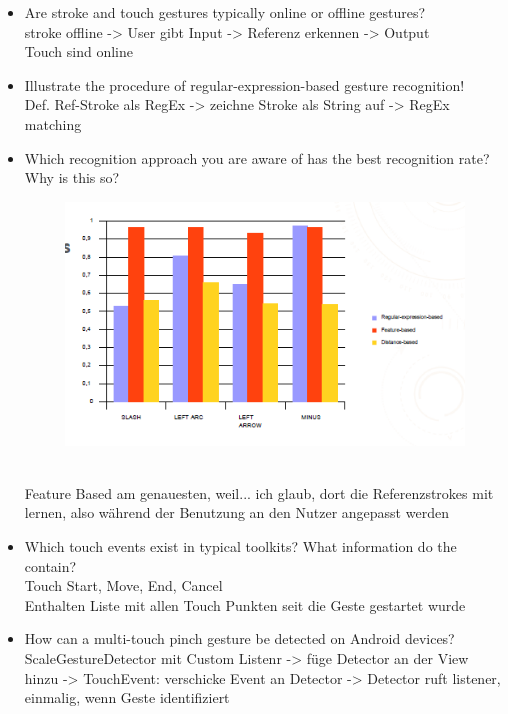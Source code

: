 \begin{itemize}
	\item Are stroke and touch gestures typically online or offline gestures?\\
	stroke offline -> User gibt Input -> Referenz erkennen -> Output\\
	Touch sind online
	
	\item Illustrate the procedure of regular-expression-based gesture recognition!\\
	Def. Ref-Stroke als RegEx -> zeichne Stroke als String auf -> RegEx matching
	
	\item Which recognition approach you are aware of has the best recognition rate? Why is this so?
	\begin{figure}[!h]
		\centering
		\includegraphics[scale=0.5]{img/gesture_recognition.png}
	\end{figure}\\
	Feature Based am genauesten, weil... ich glaub, dort die Referenzstrokes mit lernen, also während der Benutzung an den Nutzer angepasst werden
	
	\item Which touch events exist in typical toolkits? What information do the contain?\\
	Touch Start, Move, End, Cancel\\
	Enthalten Liste mit allen Touch Punkten seit die Geste gestartet wurde
	
	\item How can a multi-touch pinch gesture be detected on Android devices?\\
	ScaleGestureDetector mit Custom Listenr -> füge Detector an der View hinzu -> TouchEvent: verschicke Event an Detector -> Detector ruft listener, einmalig, wenn Geste identifiziert
	

\end{itemize}
